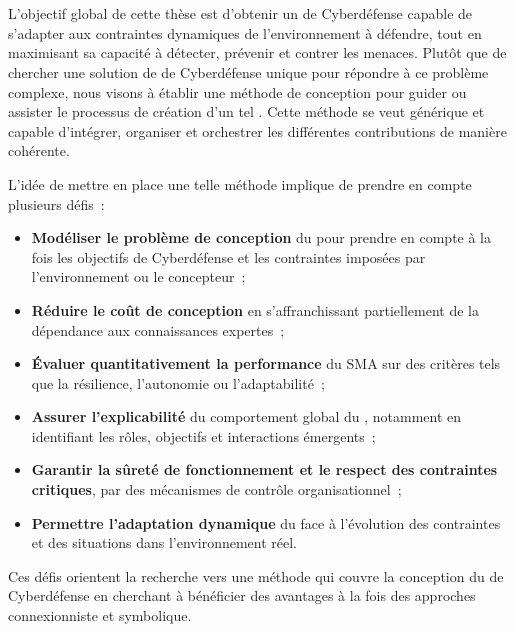 \

\bigskip

\\

\noindent
L'objectif global de cette thèse est d'obtenir un  de Cyberdéfense capable de s'adapter aux contraintes dynamiques de l'environnement à défendre, tout en maximisant sa capacité à détecter, prévenir et contrer les menaces.
%
Plutôt que de chercher une solution de  de Cyberdéfense unique pour répondre à ce problème complexe, nous visons à établir une méthode de conception pour guider ou assister le processus de création d'un tel . Cette méthode se veut générique et capable d'intégrer, organiser et orchestrer les différentes contributions de manière cohérente.

\noindent
L'idée de mettre en place une telle méthode implique de prendre en compte plusieurs défis~:
\begin{itemize}
  \item \textbf{Modéliser le problème de conception} du  pour prendre en compte à la fois les objectifs de Cyberdéfense et les contraintes imposées par l'environnement ou le concepteur~;
  \item \textbf{Réduire le coût de conception} en s'affranchissant partiellement de la dépendance aux connaissances expertes~;
  \item \textbf{Évaluer quantitativement la performance} du SMA sur des critères tels que la résilience, l'autonomie ou l'adaptabilité~;
  \item \textbf{Assurer l'explicabilité} du comportement global du , notamment en identifiant les rôles, objectifs et interactions émergents~;
  \item \textbf{Garantir la sûreté de fonctionnement et le respect des contraintes critiques}, par des mécanismes de contrôle organisationnel~;
  \item \textbf{Permettre l'adaptation dynamique} du  face à l'évolution des contraintes et des situations dans l'environnement réel.
\end{itemize}

\noindent
Ces défis orientent la recherche vers une méthode qui couvre la conception du  de Cyberdéfense en cherchant à bénéficier des avantages à la fois des approches connexionniste et symbolique.

\

\bigskip

\\

